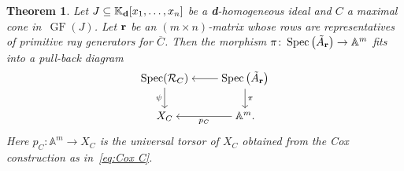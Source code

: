 \documentclass[pdftex]{sigma}%
\newtheorem{Theorem}{Theorem}[section]
\numberwithin{equation}{section}
\DeclareMathOperator{\GF}{GF}
\begin{document}
\begin{Theorem}
Let $J\subseteq\mathbb K_{\bf d}[{x_1,\dots,x_n}]$ be a {\bf d}-homogeneous ideal and $C$ a maximal cone in~$\GF(J)$.
Let ${\bf r}$ be an $(m\times n)$-matrix whose rows are representatives of primitive ray generators for $\overline C$. %
Then the morphism $\pi\colon \operatorname{Spec}\big(\tilde A_{\bf r}\big)\to \mathbb A^m$ fits into a pull-back diagram
 \begin{equation*}%
 \begin{tikzcd}[ampersand replacement=\&,cramped]
 \operatorname{Spec}(\mathcal R_C)\ar[d,"\psi"'] \&
 \operatorname{Spec}\big(\tilde A_{\bf r}\big)\ar[d,"\pi"] \ar[l]\\
 X_{C}\& \mathbb A^m. \ar[l,"p_C"]
 \end{tikzcd}
 \end{equation*}
Here $p_C\colon \mathbb A^m\to X_C$ is the universal torsor of $X_C$ obtained from the Cox construction as in~\eqref{eq:Cox C}.
\end{Theorem}
\end{document}
